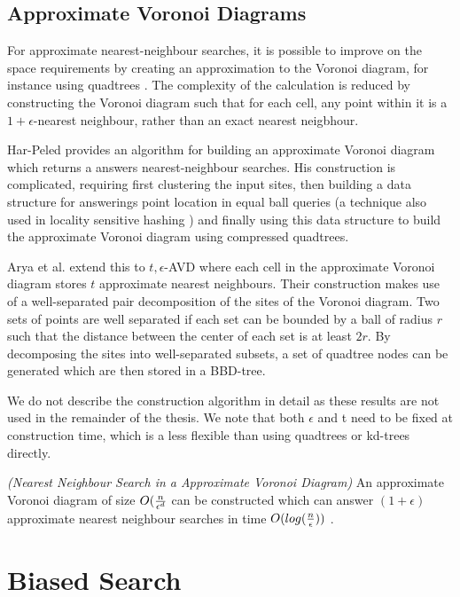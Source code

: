 \documentclass[mcs]{scsthesis}
\begin{document}
\subsection{Approximate Voronoi Diagrams}

For approximate nearest-neighbour searches, it is possible to improve on the
space requirements by creating an approximation to the Voronoi diagram, for
instance using quadtrees \cite{avd}. The complexity of the calculation is
reduced by constructing the Voronoi diagram such that for each cell, any point
within it is a \(1 + \epsilon\)-nearest neighbour, rather than an exact
nearest neigbhour.

Har-Peled \cite{avd} provides an algorithm for building an approximate
Voronoi diagram which returns a answers nearest-neighbour searches. His
construction is complicated, requiring first clustering the input sites, then
building a data structure for answerings point location in equal ball queries
(a technique also used in locality sensitive hashing \cite{lsh}) and finally
using this data structure to build the approximate Voronoi diagram using
compressed quadtrees.

Arya et al. \cite{arya-avd} extend this to \(t, \epsilon\)-AVD where each
cell in the approximate Voronoi diagram stores \(t\) approximate nearest
neighbours. Their construction makes use of a well-separated pair
decomposition of the sites of the Voronoi diagram. Two sets of points are well
separated if each set can be bounded by a ball of radius \(r\) such that the
distance between the center of each set is at least \(2r\). By decomposing
the sites into well-separated subsets, a set of quadtree nodes can be
generated which are then stored in a BBD-tree. 

We do not describe the construction algorithm in detail as these results are
not used in the remainder of the thesis. We note that both \(\epsilon\) and t
need to be fixed at construction time, which is a less flexible than using
quadtrees or kd-trees directly.

\begin{thm} \emph{(Nearest Neighbour Search in a Approximate Voronoi Diagram)} 
An approximate Voronoi diagram of size \(O({n \over \epsilon ^ d}\) can be
constructed which can answer \((1 + \epsilon)\) approximate nearest neighbour
searches in time \(O(log ({n \over \epsilon}))\) \cite{arya-avd}.
\end{thm}

\section{Biased Search}
\end{document}
